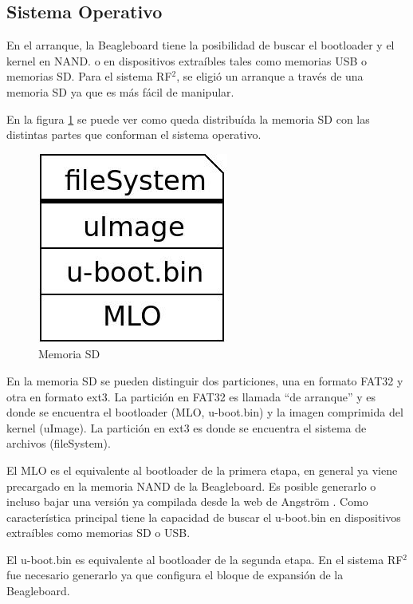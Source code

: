 \subsection{Sistema Operativo}
En el arranque, la Beagleboard tiene la posibilidad de buscar el bootloader y el kernel en NAND. o en dispositivos extraíbles tales como memorias USB o memorias SD. Para el sistema RF$^{2}$, se eligió un arranque a través de una memoria SD ya que es más fácil de manipular.

En la figura \ref{Fig:SD} se puede ver como queda distribuída la memoria SD con las distintas partes
que conforman el sistema operativo. 

\begin{figure}[H]
\centering
  \begin{center}
  \includegraphics[scale=.4]{Imagenes/sd.jpg} 
  \end{center}
  \caption{Memoria SD}\label{Fig:SD} 
\end{figure}

En la memoria SD se pueden distinguir dos particiones, una en formato FAT32 y otra
en formato ext3. La partición en FAT32 es llamada “de arranque” y es donde se encuentra 
el bootloader (MLO, u-boot.bin) y la imagen comprimida del kernel (uImage). 
La partición en ext3 es donde se encuentra el sistema de archivos (fileSystem).

El MLO es el equivalente al bootloader de la primera etapa, en general ya viene precargado en la memoria NAND de la Beagleboard. Es posible generarlo o incluso bajar una versión ya compilada desde la web de Angström \cite{Angs}. Como característica principal tiene la capacidad de buscar el u-boot.bin en dispositivos extraíbles como memorias SD o USB.

El u-boot.bin es equivalente al bootloader de la segunda etapa. En el sistema RF$^{2}$ fue necesario generarlo ya que configura el bloque de expansión de la Beagleboard.

